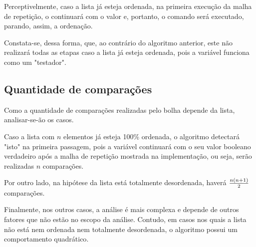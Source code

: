 Perceptivelmente, caso a lista já esteja ordenada, na primeira execução da malha de repetição, o  continuará com o valor  e, portanto, o comando  será executado, parando, assim, a ordenação.

Constata-se, dessa forma, que, ao contrário do algoritmo anterior, este não realizará todas as etapas caso a lista já esteja ordenada, pois a variável  funciona como um "testador".

\subsection*{Quantidade de comparações}
Como a quantidade de comparações realizadas pelo bolha depende da lista, analisar-se-ão os casos. 

Caso a lista com $n$ elementos já esteja 100\% ordenada, o algoritmo detectará "isto" na primeira passagem, pois a variável  continuará com o seu valor booleano verdadeiro após a malha de repetição mostrada na implementação, ou seja, serão realizadas $n$ comparações.

Por outro lado, na hipótese da lista está totalmente desordenada, haverá $n(n+1)\over 2$ comparações. 

Finalmente, nos outros casos, a análise é mais complexa e depende de outros fatores que não estão no escopo da análise. Contudo, em casos nos quais a lista não está nem ordenada nem totalmente desordenada, o algoritmo possui um comportamento quadrático\cite{bubblecomplexity}.
